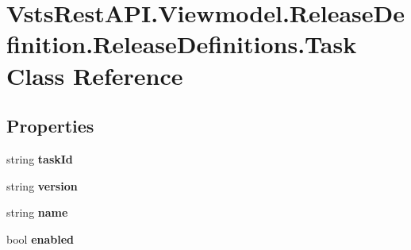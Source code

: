 \hypertarget{class_vsts_rest_a_p_i_1_1_viewmodel_1_1_release_definition_1_1_release_definitions_1_1_task}{}\section{Vsts\+Rest\+A\+P\+I.\+Viewmodel.\+Release\+Definition.\+Release\+Definitions.\+Task Class Reference}
\label{class_vsts_rest_a_p_i_1_1_viewmodel_1_1_release_definition_1_1_release_definitions_1_1_task}
\subsection*{Properties}
\begin{DoxyCompactItemize}
\item 
\mbox{\label{class_vsts_rest_a_p_i_1_1_viewmodel_1_1_release_definition_1_1_release_definitions_1_1_task_a80b16ae19503cc52c5fe1e6de7356044}} 
string {\bfseries task\+Id}
\item 
\mbox{\label{class_vsts_rest_a_p_i_1_1_viewmodel_1_1_release_definition_1_1_release_definitions_1_1_task_aac36e9f6bcada61c927ba45a9c79ff6b}} 
string {\bfseries version}
\item 
\mbox{\label{class_vsts_rest_a_p_i_1_1_viewmodel_1_1_release_definition_1_1_release_definitions_1_1_task_a4fa81fa2fa43c0ff70a171dbf1f895e0}} 
string {\bfseries name}
\item 
\mbox{\label{class_vsts_rest_a_p_i_1_1_viewmodel_1_1_release_definition_1_1_release_definitions_1_1_task_a24db1ee9c8eb32d7d0e0af329bae0f00}} 
bool {\bfseries enabled}

\end{DoxyCompactItemize}
